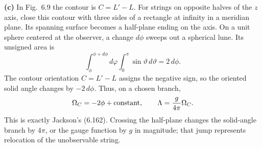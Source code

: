 \textbf{(c)} In Fig.~6.9 the contour is $C=L'-L$. For strings on opposite
halves of the $z$ axis, close this contour with three sides of a rectangle
at infinity in a meridian plane. Its spanning surface becomes a half-plane
ending on the axis. On a unit sphere centered at the observer, a change
$d\phi$ sweeps out a spherical lune. Its unsigned area is
\[
\int_\phi^{\phi+d\phi}d\varphi\int_0^\pi\sin\vartheta\,d\vartheta
=2\,d\phi.
\]
The contour orientation $C=L'-L$ assigns the negative sign, so the
oriented solid angle changes by $-2\,d\phi$.
Thus, on a chosen branch,
\[
\Omega_C=-2\phi+\hbox{constant},\qquad
\Lambda=\frac g{4\pi}\Omega_C.
\]
This is exactly Jackson's (6.162). Crossing the half-plane changes the
solid-angle branch by $4\pi$, or the gauge function by $g$ in magnitude;
that jump represents relocation of the unobservable string.

